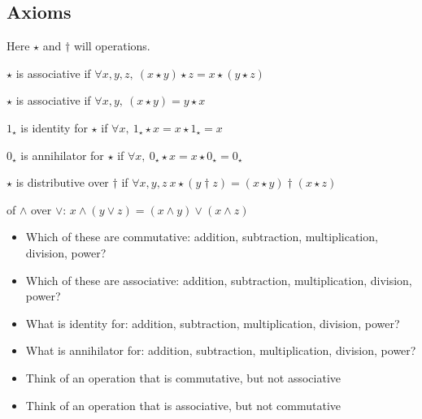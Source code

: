 \subsection{Axioms}
Here $ \star $ and $ \dagger $ will operations.
\begin{definition}[Associativity]
    $\star$ is associative if $\forall x,y,z, \ (x \star y) \star z = x \star (y \star z)$
\end{definition}
\begin{definition}[Commutativity]
    $\star$ is associative if $\forall x,y, \ (x \star y) = y \star x$
\end{definition}
\begin{definition}[Identity]
    $1_{\star}$ is identity for $\star$ if $\forall x, \ 1_{\star} \star x = x \star 1_{\star} = x$
\end{definition}
\begin{definition}[Annihilator]
    $0_{\star}$ is annihilator for $\star$ if $\forall x, \ 0_{\star} \star x = x \star 0_{\star} = 0_{\star}$
\end{definition}
\begin{definition}[Distributivity]
    $\star$ is distributive over $\dagger$ if $\forall x,y,z \ x \star (y \dagger z) = (x \star y) \dagger (x \star z)$
\end{definition}


 of $\land$ over $\lor$:  $x \land (y \lor z) = (x \land y) \lor (x \land z)$
\begin{question}
    \begin{itemize}\textit{(make a table)}
        \item Which of these are commutative: addition, subtraction, multiplication, division, power?
        \item Which of these are associative: addition, subtraction, multiplication, division, power?
        \item What is identity for: addition, subtraction, multiplication, division, power?
        \item What is annihilator for: addition, subtraction, multiplication, division, power?
    \end{itemize}
\end{question}
\begin{question}
    \begin{itemize}
        \item Think of an operation that is commutative, but not associative
        \item Think of an operation that is associative, but not commutative
    \end{itemize}
\end{question}


